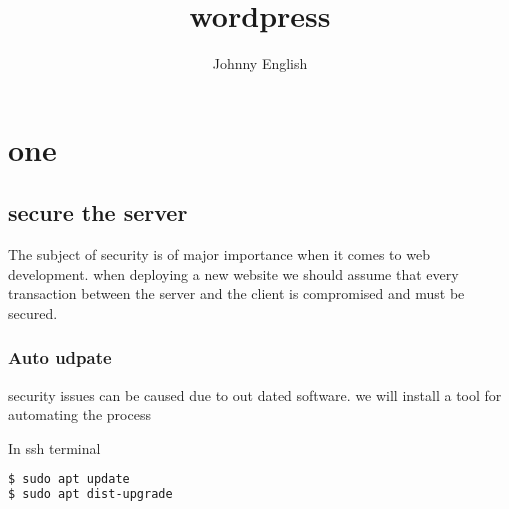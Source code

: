 \documentclass{book}
\title{wordpress}
\author{Johnny English}
\begin{document}
\maketitle
{
\hypersetup{linkcolor=black}
\tableofcontents
}
\part{one}
\chapter{secure the server}
The subject of security is of major importance when it comes to web development.
when deploying a new website we should assume that every transaction between the 
server and the client is compromised and must be secured. 

\section{Auto udpate}
security issues can be caused due to out dated software. we will install a tool for 
automating the process

In ssh terminal
\begin{lstlisting}[language=bash]
$ sudo apt update
$ sudo apt dist-upgrade
\end{lstlisting}
\end{document}
